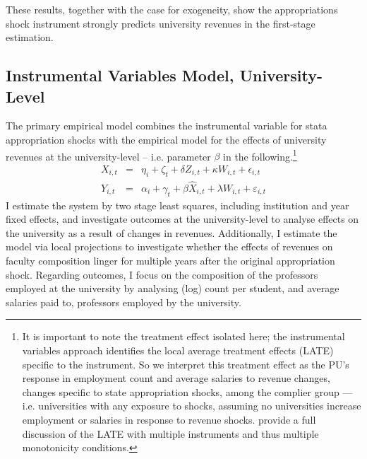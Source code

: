 \documentclass[notitlepage,12pt]{article}
\begin{document}
These results, together with the case for exogeneity, show the appropriations shock instrument strongly predicts university revenues in the first-stage estimation.


\subsection{Instrumental Variables Model, University-Level}
\label{sec:iv-model-uni}

The primary empirical model combines the instrumental variable for stata appropriation shocks with the empirical model for the effects of university revenues at the university-level -- i.e. parameter $\beta$ in the following.\footnote{
    It is important to note the treatment effect isolated here; the instrumental variables approach identifies the local average treatment effects (LATE) specific to the instrument.
    So we interpret this treatment effect as the PU's response in employment count and average salaries to revenue changes, changes specific to state appropriation shocks, among the complier group --- i.e. universities with any exposure to shocks, assuming no universities increase employment or salaries in response to revenue shocks.
    \cite{mogstad2021causal} provide a full discussion of the LATE with multiple instruments and thus multiple monotonicity conditions.
}
\begin{eqnarray}
    \label{eqn:secondstage1}
    X_{i,t} &=& \eta_i + \zeta_t + \delta Z_{i,t} + \kappa W_{i,t} + \epsilon_{i,t} \\
    \label{eqn:secondstage2}
    Y_{i,t} &=& \alpha_i + \gamma_t + \beta \widehat X_{i,t} + \lambda W_{i,t} + \varepsilon_{i,t}
\end{eqnarray}
I estimate the system by two stage least squares, including institution and year fixed effects, and investigate outcomes at the university-level to analyse effects on the university as a result of changes in revenues.
Additionally, I estimate the model via local projections \citep{jorda2005,miller2022} to investigate whether the effects of revenues on faculty composition linger for multiple years after the original appropriation shock.
Regarding outcomes, I focus on the composition of the professors employed at the university by analysing (log) count per student, and average salaries paid to, professors employed by the university.
\end{document}
